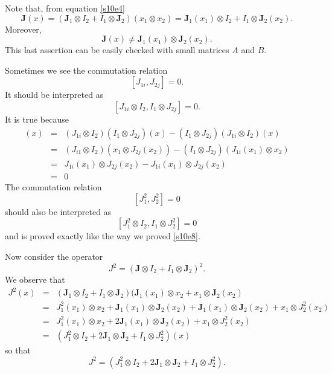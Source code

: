 \documentclass{article}
\numberwithin{equation}{section}
\let\vec\bm
\theoremstyle{plain}
\numberwithin{thm}{section}
\theoremstyle{plain}
\numberwithin{prop}{section}
\theoremstyle{definition}
\numberwithin{defn}{section}
\theoremstyle{remark}
\begin{document}
Note that, from equation \eqref{s10e4}
\begin{equation}\label{s10e6}
\vec{J}(x) = (\vec{J}_1 \otimes I_2 + I_1 \otimes \vec{J}_2)(x_1 \otimes x_2)
= \vec{J}_1(x_1) \otimes I_2 + I_1 \otimes \vec{J}_2(x_2).
\end{equation}
Moreover,
\begin{equation}\label{s10e7}
\vec{J}(x) \ne \vec{J}_1(x_1) \otimes \vec{J}_2(x_2).
\end{equation}
This last assertion can be easily checked with small matrices $A$ and $B$.

Sometimes we see the commutation relation
\begin{equation}\label{s10e8}
[J_{1i}, J_{2j}] = 0.
\end{equation}
It should be interpreted as
\begin{equation}\label{s10e9}
[J_{1i} \otimes I_2, I_1 \otimes J_{2j}] = 0.
\end{equation}
It is true because
\begin{eqnarray*}
[J_{1i} \otimes I_2, I_1 \otimes J_{2j}](x) &=&
(J_{1i} \otimes I_2)(I_1 \otimes J_{2j})(x) - 
(I_1 \otimes J_{2j})(J_{1i} \otimes I_2)(x) \\
&=& (J_{i1}\otimes I_2)(x_1 \otimes J_{2j}(x_2)) - (I_1\otimes J_{2j})
(J_{1i}(x_1) \otimes x_2) \\
&=& J_{1i}(x_1) \otimes J_{2j}(x_2) - J_{1i}(x_1) \otimes J_{2j}(x_2) \\
&=& 0
\end{eqnarray*}
The commutation relation
\begin{equation}\label{s10e10}
[J_1^2, J_2^2] = 0
\end{equation}
should also be interpreted as
\begin{equation}\label{s10e11}
[J_1^2 \otimes I_2, I_1 \otimes J_2^2] = 0
\end{equation}
and is proved exactly like the way we proved \eqref{s10e8}.

Now consider the operator
\begin{equation}\label{s10e12}
J^2 = (\vec{J} \otimes I_2 + I_1 \otimes\vec{J}_2)^2.
\end{equation}
We observe that
\begin{eqnarray*}
J^2(x) &=& (\vec{J}_1 \otimes I_2 + I_1 \otimes\vec{J}_2)
(\vec{J}_1(x_1) \otimes x_2 + x_1 \otimes \vec{J}_2(x_2) \\
&=& J_1^2(x_1) \otimes x_2 + \vec{J}_1(x_1) \otimes \vec{J}_2(x_2) + 
\vec{J}_1(x_1) \otimes \vec{J}_2(x_2) + x_1 \otimes J_2^2(x_2) \\
&=& J_1^2(x_1) \otimes x_2 + 2\vec{J}_1(x_1) \otimes \vec{J}_2(x_2) + 
x_1 \otimes J_2^2(x_2) \\
&=& (J_1^2 \otimes I_2 + 2\vec{J}_1 \otimes \vec{J}_2 + I_1 \otimes J_2^2)(x)
\end{eqnarray*}
so that
\begin{equation}\label{s10e13}
J^2 =(J_1^2 \otimes I_2 + 2\vec{J}_1 \otimes \vec{J}_2 + I_1 \otimes J_2^2).
\end{equation}
\end{document}
